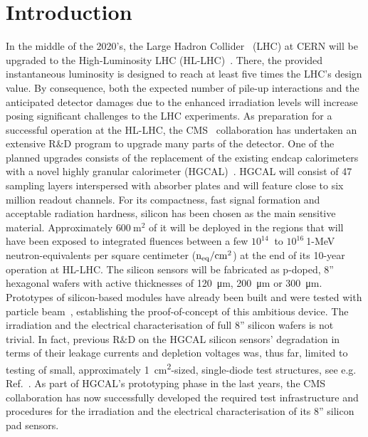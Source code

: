 \section{Introduction}
\label{sec:introduction}
In the middle of the 2020's, the Large Hadron Collider~\cite{evans:2008} (LHC) at CERN will be upgraded to the High-Luminosity LHC (HL-LHC)~\cite{hl-lhc-tdr:2017}.
There, the provided instantaneous luminosity is designed to reach at least five times the LHC's design value.
By consequence, both the expected number of pile-up interactions and the anticipated detector damages due to the enhanced irradiation levels will increase posing significant challenges to the LHC experiments.\newline
As preparation for a successful operation at the HL-LHC, the CMS~\cite{cms:2008} collaboration has undertaken an extensive R$\&$D program to upgrade many parts of the detector.
One of the planned upgrades consists of the replacement of the existing endcap calorimeters with a novel highly granular calorimeter (HGCAL)~\cite{hgcal-tdr:2018}.
HGCAL will consist of 47 sampling layers interspersed with absorber plates and will feature close to six million readout channels.
For its compactness, fast signal formation and acceptable radiation hardness, silicon has been chosen as the main sensitive material.
Approximately $\SI{600}{\metre\squared}$ of it will be deployed in the regions that will have been exposed to integrated fluences between a few $10^{14}~$ to $10^{16}~$1-MeV neutron-equivalents per square centimeter ($\mathrm{n_{eq}}/\mathrm{cm}^{2}$) at the end of its 10-year operation at HL-LHC. 
The silicon sensors will be fabricated as p-doped, 8'' hexagonal wafers with active thicknesses of \SI{120}{\micro\metre}, \SI{200}{\micro\metre} or \SI{300}{\micro\metre}.\newline
Prototypes of silicon-based modules have already been built and were tested with particle beam~\cite{cms_hgc-2016-beamtests,H1:2020,H2:2020}, establishing the proof-of-concept of this ambitious device.\newline
The irradiation and the electrical characterisation of full 8'' silicon wafers is not trivial.
In fact, previous R$\&$D on the HGCAL silicon sensors' degradation in terms of their leakage currents and depletion voltages was, thus far, limited to testing of small, approximately \SI{1}{\centi\metre\squared}-sized, single-diode test structures, see e.g. Ref.~\cite{Curr_s_2017}.
As part of HGCAL's prototyping phase in the last years, the CMS collaboration has now successfully developed the required test infrastructure and procedures for the irradiation and the electrical characterisation of its 8'' silicon pad sensors.

